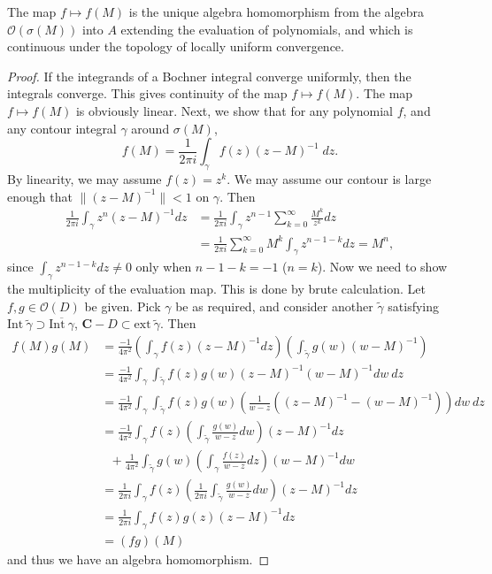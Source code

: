 \begin{theorem}
    The map $f \mapsto f(M)$ is the unique algebra homomorphism from the algebra $\mathcal{O}(\sigma(M))$ into $A$ extending the evaluation of polynomials, and which is continuous under the topology of locally uniform convergence.
\end{theorem}
\begin{proof}
    If the integrands of a Bochner integral converge uniformly, then the integrals converge. This gives continuity of the map $f \mapsto f(M)$. The map $f \mapsto f(M)$ is obviously linear. Next, we show that for any polynomial $f$, and any contour integral $\gamma$ around $\sigma(M)$,
    \[ f(M) = \frac{1}{2 \pi i} \int_\gamma f(z) (z - M)^{-1}\; dz. \]
    By linearity, we may assume $f(z) = z^k$. We may assume our contour is large enough that $\| (z - M)^{-1} \| < 1$ on $\gamma$. Then
    \begin{align*}
        \frac{1}{2 \pi i} \int_\gamma z^n (z - M)^{-1} dz &= \frac{1}{2 \pi i} \int_\gamma z^{n-1} \sum_{k = 0}^\infty \frac{M^k}{z^k} dz\\
        &= \frac{1}{2 \pi i} \sum_{k = 0}^\infty M^k \int_\gamma z^{n - 1 - k} dz = M^n,
    \end{align*}
    since $\int_\gamma z^{n-1-k} dz \neq 0$ only when $n - 1 - k = -1$ ($n = k$). Now we need to show the multiplicity of the evaluation map. This is done by brute calculation. Let $f,g \in \mathcal{O}(D)$ be given. Pick $\gamma$ be as required, and consider another $\tilde{\gamma}$ satisfying $\text{Int}\ \tilde{\gamma} \supset \overline{\text{Int}\ \gamma}$, $\mathbf{C} - D \subset \text{ext}\ \tilde{\gamma}$. Then
    \begin{align*}
        f(M) g(M) &= \frac{-1}{4 \pi^2} \left( \int_\gamma f(z) (z - M)^{-1} dz \right) \left( \int_{\tilde{\gamma}} g(w) (w - M)^{-1} \right)\\
        &= \frac{-1}{4 \pi^2} \int_\gamma \int_{\tilde{\gamma}} f(z) g(w) (z - M)^{-1} (w - M)^{-1} dw\ dz\\
        &= \frac{-1}{4 \pi^2} \int_\gamma \int_{\tilde{\gamma}} f(z) g(w) \left( \frac{1}{w - z} \left((z - M)^{-1} - (w - M)^{-1} \right) \right) dw\ dz\\
        &= \frac{-1}{4 \pi^2} \int_\gamma f(z) \left( \int_{\tilde{\gamma}} \frac{g(w)}{w - z} dw \right) (z - M)^{-1} dz\\
        &\ \ \ + \frac{1}{4 \pi^2} \int_{\tilde{\gamma}} g(w) \left( \int_\gamma \frac{f(z)}{w - z} dz \right) (w - M)^{-1} dw\\
        &= \frac{1}{2 \pi i} \int_\gamma f(z) \left( \frac{1}{2 \pi i} \int_{\tilde{\gamma}} \frac{g(w)}{w - z} dw \right) (z - M)^{-1} dz\\
        &= \frac{1}{2 \pi i} \int_\gamma f(z) g(z) (z - M)^{-1} dz\\
        &= (fg)(M)
    \end{align*}
    and thus we have an algebra homomorphism.


\end{proof}
